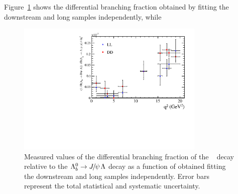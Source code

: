 Figure~\ref{fig:corrDDLLplots} shows the differential branching fraction obtained by fitting 
the downstream and long samples independently, while
%
\begin{figure}
\centering
\includegraphics[width=0.8\textwidth]{Lmumu/figs/q2result_both.pdf}
\caption{Measured values of the differential branching fraction of the \mbox{\decay{\Lb}{\Lz\mumu} }
decay relative to the $\Lb\to\jpsi\Lz$ decay as a function of \qsq
obtained fitting the downstream and long samples independently.
Error bars represent the total statistical and systematic uncertainty.}
\label{fig:corrDDLLplots}
\end{figure}
%
%
%
%
%
%
